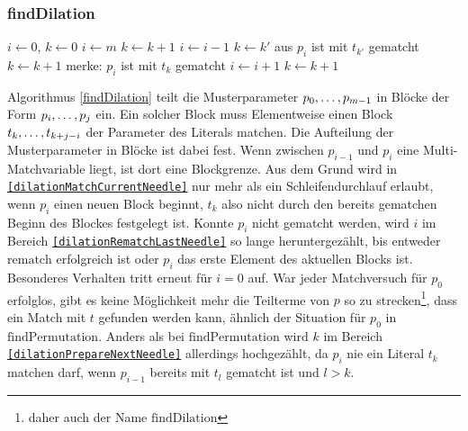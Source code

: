 \subsubsection {findDilation}
\begin{algorithm}
\DontPrintSemicolon
\caption{$\mathrm{findDilation} \colon M \times T \times \mathit{Bool} \rightarrow \mathit{Bool}$}\label{findDilation}
\Let $i \leftarrow 0$, $k \leftarrow 0$\;
 {
	$i \leftarrow m$\;
	\Goto {\ref{dilationRematchLastNeedle}}\;
}
 {
}
 {
}
 \label{dilationMatchCurrentNeedle} 
 {
	 { 
		 {
			\Goto {\ref{dilationPrepareNextNeedle}}\;
		}
		$k \leftarrow k + 1$\;
	}
}
 \label{dilationRematchLastNeedle} 
 {
	$i \leftarrow i - 1$\;
	{$k \leftarrow k'$ aus \glqq $p_{i}$ ist mit $t_{k'}$ gematcht\grqq{}}\;
	 {
		\Goto {\ref{dilationPrepareNextNeedle}}\;
	}
	 {
		$k \leftarrow k + 1$\;
	\Goto {\ref{dilationMatchCurrentNeedle}}\;
	}
}
\;
 \label{dilationPrepareNextNeedle} 
merke: $p_i$ ist mit $t_k$ gematcht\;
$i \leftarrow i + 1$\;
$k \leftarrow k + 1$\;
 {
	\Goto {\ref{dilationMatchCurrentNeedle}}\;
}
 {
	\Goto {\ref{dilationRematchLastNeedle}}\;
}
\end{algorithm}


Algorithmus \ref{findDilation} teilt die Musterparameter ${p}_{0}, \dots, {p}_{m-1}$ in Blöcke der Form ${p}_{i}, \dots, {p}_{j}$ ein. Ein solcher Block muss Elementweise einen Block ${t}_{k}, \dots, {t}_{k + j - i}$ der Parameter des Literals matchen. Die Aufteilung der Musterparameter in Blöcke ist dabei fest. Wenn zwischen $p_{i-1}$ und $p_{i}$ eine Multi-Matchvariable liegt, ist dort eine Blockgrenze. Aus dem Grund wird in \texttt{\ref{dilationMatchCurrentNeedle}} nur mehr als ein Schleifendurchlauf erlaubt, wenn $p_i$ einen neuen Block beginnt, $t_k$ also nicht durch den bereits gematchen Beginn des Blockes festgelegt ist. 
Konnte $p_i$ nicht gematcht werden, wird  $i$ im Bereich \texttt{\ref{dilationRematchLastNeedle}} so lange heruntergezählt, bis entweder $\mathrm{rematch}$ erfolgreich ist oder $p_i$ das erste Element des aktuellen Blocks ist. Besonderes Verhalten tritt erneut für $i = 0$ auf. War jeder Matchversuch für $p_0$ erfolglos, gibt es keine Möglichkeit mehr die Teilterme von $p$ so zu \glqq strecken\grqq{}\footnote{daher auch der Name $\mathrm{findDilation}$}, dass ein Match mit $t$ gefunden werden kann, ähnlich der Situation für $p_0$ in $\mathrm{findPermutation}$. Anders als bei $\mathrm{findPermutation}$ wird $k$ im Bereich \texttt{\ref{dilationPrepareNextNeedle}} allerdings hochgezählt, da $p_i$ nie ein Literal $t_k$ matchen darf, wenn $p_{i-1}$ bereits mit $t_l$ gematcht ist und $l > k$.


